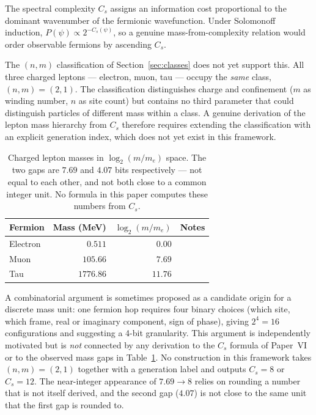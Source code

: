 \documentclass[11pt]{article}
\begin{document}
The spectral complexity $C_s$ assigns an information cost
proportional to the dominant wavenumber of the fermionic wavefunction.
Under Solomonoff induction, $P(\psi) \propto 2^{-C_s(\psi)}$, so a
genuine mass-from-complexity relation would order observable fermions
by ascending $C_s$.

The $(n,m)$ classification of Section~\ref{sec:classes} does not yet
support this.
All three charged leptons --- electron, muon, tau --- occupy the
\emph{same} class, $(n,m) = (2,1)$.
The classification distinguishes charge and confinement
($m$ as winding number, $n$ as site count) but contains no third
parameter that could distinguish particles of different mass within
a class.
A genuine derivation of the lepton mass hierarchy from $C_s$ therefore
requires extending the classification with an explicit generation
index, which does not yet exist in this framework.

\begin{table}[h]
\centering
\begin{tabular}{lrrl}
\toprule
Fermion & Mass (MeV) & $\log_2(m/m_e)$ & Notes \\
\midrule
Electron &       $0.511$ &  $0.00$ & \\
Muon     &     $105.66$  &  $7.69$ & \\
Tau      &    $1776.86$  & $11.76$ & \\
\bottomrule
\end{tabular}
\caption{Charged lepton masses in $\log_2(m/m_e)$ space.
The two gaps are $7.69$ and $4.07$ bits respectively --- not equal
to each other, and not both close to a common integer unit.
No formula in this paper computes these numbers from $C_s$.}
\label{tab:masses}
\end{table}

A combinatorial argument is sometimes proposed as a candidate origin
for a discrete mass unit: one fermion hop requires four binary
choices (which site, which frame, real or imaginary component, sign
of phase), giving $2^4 = 16$ configurations and suggesting a 4-bit
granularity.
This argument is independently motivated but is \emph{not} connected
by any derivation to the $C_s$ formula of Paper~VI or to the observed
mass gaps in Table~\ref{tab:masses}.
No construction in this framework takes $(n,m) = (2,1)$ together with
a generation label and outputs $C_s = 8$ or $C_s = 12$.
The near-integer appearance of $7.69 \to 8$ relies on rounding a
number that is not itself derived, and the second gap ($4.07$) is
not close to the same unit that the first gap is rounded to.
\end{document}
